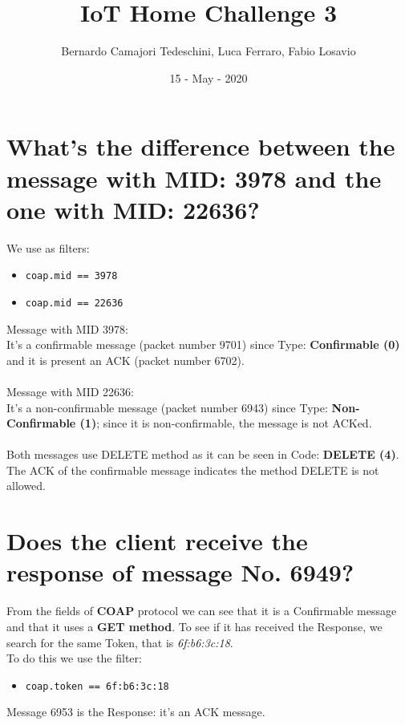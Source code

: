\documentclass{article} %
\title{\textbf{\huge{IoT Home Challenge 3}}}
\author{Bernardo Camajori Tedeschini, Luca Ferraro, Fabio Losavio}
\date{15 - May - 2020}
\begin{document}

\maketitle


\section{\large{What’s the difference between the message with MID: 3978 and the one with MID: 22636?}}
    We use as filters:
    \begin{itemize}
        \item \texttt{coap.mid == 3978}
        \item \texttt{coap.mid == 22636}
    \end{itemize}
    Message with MID 3978: \\
    It’s a confirmable message (packet number 9701) since Type: \textbf{Confirmable (0)} and it is present an ACK (packet number 6702). \\ \\
    Message with MID 22636: \\
    It’s a non-confirmable message (packet number 6943) since Type: \textbf{Non-Confirmable (1)}; since it is non-confirmable, the message is not ACKed. \\ \\
    Both messages use DELETE method as it can be seen in Code: \textbf{DELETE (4)}. 
    The ACK of the confirmable message indicates the method DELETE is not allowed. 

    
\section{\large{Does the client receive the response of message No. 6949?}}
    From the fields of \textbf{COAP} protocol we can see that it is a Confirmable message and that it uses a \textbf{GET method}. 
    To see if it has received the Response, we search for the same Token, that is \textit{6f:b6:3c:18}. \\
    To do this we use the filter:
    \begin{itemize}
        \item \texttt{coap.token == 6f:b6:3c:18} 
    \end{itemize}
    Message 6953 is the Response: it's an ACK message.
\end{document}
